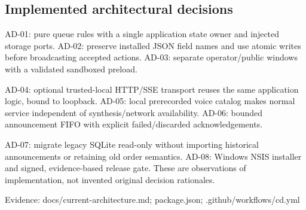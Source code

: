 \subsection{Implemented architectural decisions}

AD-01: pure queue rules with a single application state owner and injected storage ports. AD-02: preserve installed JSON field names and use atomic writes before broadcasting accepted actions. AD-03: separate operator/public windows with a validated sandboxed preload.

AD-04: optional trusted-local HTTP/SSE transport reuses the same application logic, bound to loopback. AD-05: local prerecorded voice catalog makes normal service independent of synthesis/network availability. AD-06: bounded announcement FIFO with explicit failed/discarded acknowledgements.

AD-07: migrate legacy SQLite read-only without importing historical announcements or retaining old order semantics. AD-08: Windows NSIS installer and signed, evidence-based release gate. These are observations of implementation, not invented original decision rationales.

Evidence: docs/current-architecture.md; package.json; .github/workflows/cd.yml
